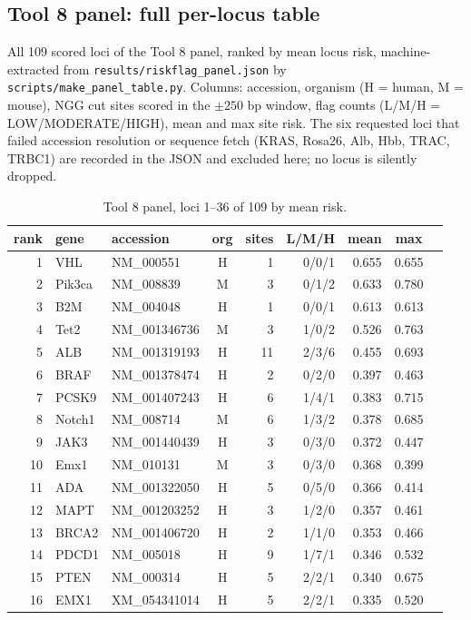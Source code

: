 \subsection{Tool 8 panel: full per-locus table}
\label{app:panel-table}
All 109 scored loci of the Tool 8 panel, ranked by mean locus risk,
machine-extracted from \texttt{results/riskflag\_panel.json} by
\texttt{scripts/make\_panel\_table.py}. Columns: accession, organism
(H = human, M = mouse), NGG cut sites scored in the $\pm250$ bp window,
flag counts (L/M/H = LOW/MODERATE/HIGH), mean and max site risk. The six
requested loci that failed accession resolution or sequence fetch (KRAS,
Rosa26, Alb, Hbb, TRAC, TRBC1) are recorded in the JSON and excluded
here; no locus is silently dropped.
\begin{table}[h]
\centering\footnotesize
\caption{Tool 8 panel, loci 1--36 of 109 by mean risk.}
\begin{tabular}{rllcrrrcc}
\hline
rank & gene & accession & org & sites & L/M/H & mean & max \\
\hline
1 & VHL & NM\_000551 & H & 1 & 0/0/1 & 0.655 & 0.655 \\
2 & Pik3ca & NM\_008839 & M & 3 & 0/1/2 & 0.633 & 0.780 \\
3 & B2M & NM\_004048 & H & 1 & 0/0/1 & 0.613 & 0.613 \\
4 & Tet2 & NM\_001346736 & M & 3 & 1/0/2 & 0.526 & 0.763 \\
5 & ALB & NM\_001319193 & H & 11 & 2/3/6 & 0.455 & 0.693 \\
6 & BRAF & NM\_001378474 & H & 2 & 0/2/0 & 0.397 & 0.463 \\
7 & PCSK9 & NM\_001407243 & H & 6 & 1/4/1 & 0.383 & 0.715 \\
8 & Notch1 & NM\_008714 & M & 6 & 1/3/2 & 0.378 & 0.685 \\
9 & JAK3 & NM\_001440439 & H & 3 & 0/3/0 & 0.372 & 0.447 \\
10 & Emx1 & NM\_010131 & M & 3 & 0/3/0 & 0.368 & 0.399 \\
11 & ADA & NM\_001322050 & H & 5 & 0/5/0 & 0.366 & 0.414 \\
12 & MAPT & NM\_001203252 & H & 3 & 1/2/0 & 0.357 & 0.461 \\
13 & BRCA2 & NM\_001406720 & H & 2 & 1/1/0 & 0.353 & 0.466 \\
14 & PDCD1 & NM\_005018 & H & 9 & 1/7/1 & 0.346 & 0.532 \\
15 & PTEN & NM\_000314 & H & 5 & 2/2/1 & 0.340 & 0.675 \\
16 & EMX1 & XM\_054341014 & H & 5 & 2/2/1 & 0.335 & 0.520 \\

\end{tabular}
\end{table}
